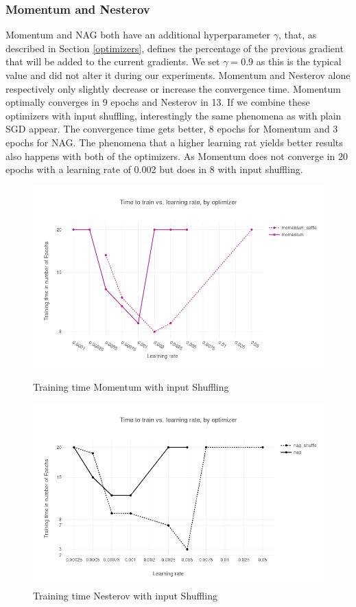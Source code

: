 \subsubsection{Momentum and Nesterov}
Momentum and NAG \cite{nag} both have an additional hyperparameter $\gamma$, that, as described in Section \ref{optimizers}, defines the percentage of the previous gradient that will be added to the current gradients. We set $\gamma = 0.9$ as this is the typical value and did not alter it during our experiments. Momentum and Nesterov alone respectively only slightly decrease or increase the convergence time. Momentum optimally converges in 9 epochs and Nesterov in 13. If we combine these optimizers with input shuffling, interestingly the same phenomena as with plain SGD appear. The convergence time gets better, 8 epochs for Momentum and 3 epochs for NAG. The phenomena that a higher learning rat yields better results also happens with both of the optimizers. As Momentum does not converge in 20 epochs with a learning rate of 0.002 but does in 8 with input shuffling.
\begin{figure}[h]
\centering
\begin{minipage}{.5\textwidth}
\centering
\includegraphics[scale=0.3]{images/results_mom_shuffle}
\caption{Training time Momentum with input Shuffling}
\label{fig:results_mom}
\label{fig:test1}
\end{minipage}%
\begin{minipage}{.5\textwidth}
\centering
\includegraphics[scale=0.3]{images/results_nag_shuffle}
\caption{Training time Nesterov with input Shuffling}
\label{fig:results_nag}
\end{minipage}
\end{figure}
